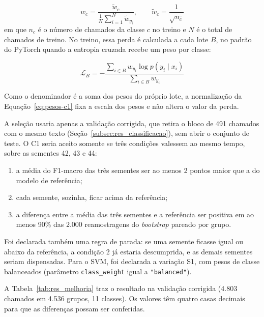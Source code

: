 \documentclass[
    12pt,                %
    openright,           %
    oneside,             %
    a4paper,             %
    english,             %
    brazil               %
]{abntex2}
\begin{document}
\begin{equation}
w_c = \frac{\tilde w_c}{\frac{1}{N}\sum_{i=1}^{N} \tilde w_{y_i}}, \qquad
\tilde w_c = \frac{1}{\sqrt{n_c}}
\label{eq:pesos-c1}
\end{equation}
em que $n_c$ é o número de chamados da classe $c$ no treino e $N$ é o total de chamados de treino. No treino, essa perda é calculada a cada lote $B$, no padrão do PyTorch quando a entropia cruzada recebe um peso por classe:

\begin{equation}
\mathcal{L}_B = -\frac{\sum_{i \in B} w_{y_i} \log p(y_i \mid x_i)}{\sum_{i \in B} w_{y_i}}
\label{eq:perda-c1}
\end{equation}

Como o denominador é a soma dos pesos do próprio lote, a normalização da Equação~\ref{eq:pesos-c1} fixa a escala dos pesos e não altera o valor da perda. %

A seleção usaria apenas a validação corrigida, que retira o bloco de 491 chamados com o mesmo texto (Seção~\ref{subsec:res_classificacao}), sem abrir o conjunto de teste. O C1 seria aceito somente se três condições valessem ao mesmo tempo, sobre as sementes 42, 43 e 44:

\begin{enumerate}
  \item a média do F1-macro das três sementes ser ao menos 2 pontos maior que a do modelo de referência;
  \item cada semente, sozinha, ficar acima da referência;
  \item a diferença entre a média das três sementes e a referência ser positiva em ao menos 90\% das 2.000 reamostragens do \textit{bootstrap} pareado por grupo.
\end{enumerate}

Foi declarada também uma regra de parada: se uma semente ficasse igual ou abaixo da referência, a condição 2 já estaria descumprida, e as demais sementes seriam dispensadas. Para o SVM, foi declarada a variação S1, com pesos de classe balanceados (parâmetro \texttt{class\_weight} igual a \texttt{"balanced"}).

A Tabela~\ref{tab:res_melhoria} traz o resultado na validação corrigida (4.803 chamados em 4.536 grupos, 11 classes). Os valores têm quatro casas decimais para que as diferenças possam ser conferidas.
\end{document}
